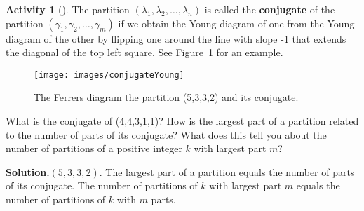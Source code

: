 \documentclass[10pt,]{book}
\newcommand{\terminology}[1]{\textbf{#1}}
\theoremstyle{plain}
\theoremstyle{definition}
\newtheorem{activity}[project]{Activity}
\numberwithin{equation}{chapter}
\begin{document}
\begin{activity}[]\label{activity-140}
The partition \((\lambda_1,\lambda_2,\ldots, \lambda_n)\) is called the \terminology{conjugate} of the partition \((\gamma_1,\gamma_2,\ldots, \gamma_m)\) if we obtain the Young diagram of one from the Young diagram of the other by flipping one around the line with slope -1 that extends the diagonal of the top left square. See \hyperref[conjugateYoung]{Figure~\ref{conjugateYoung}} for an example.%
\begin{figure}
\centering
\texttt{[image: images/conjugateYoung]}
\caption{The Ferrers diagram the partition (5,3,3,2) and its conjugate.\label{conjugateYoung}}
\end{figure}
What is the conjugate of (4,4,3,1,1)? How is the largest part of a partition related to the number of parts of its conjugate? What does this tell you about the number of partitions of a positive integer \(k\) with largest part \(m\)?%
\par\medskip\noindent%
\textbf{Solution.}\quad \((5,3,3,2)\). The largest part of a partition equals the number of parts of its conjugate. The number of partitions of \(k\) with largest part \(m\) equals the number of partitions of \(k\) with \(m\) parts.%
\end{activity}
\end{document}
